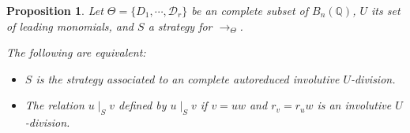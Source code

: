 \documentclass[10pt]{easychair}
\newtheorem{proposition}[theorem]{Proposition}
\theoremstyle{definition}
\newcommand\D{\mathcal{D}}
\newcommand\Q{\mathbb{Q}}
\newcommand\Weyl[1]{B_{#1}(\Q)}
\newcommand\rewTheta{\to_{\Theta}}
\newcommand\divInv[1]{\mid_{#1}}
\begin{document}
\begin{proposition}
Let $\Theta=\{D_1,\cdots,\D_r\}$ be an complete subset of
$\Weyl{n}$,  $U$ its set of leading monomials, and $S$ a strategy for $\rewTheta$.

The following are equivalent:
\begin{itemize}
\item $S$ is the strategy associated to an complete autoreduced involutive $U$-division.
\item The relation $u \divInv{S} v$ defined by $u \divInv{S} v$ if $v = u w$ and $r_v = r_u w$ is an involutive $U$-division. 
\end{itemize}
\end{proposition}
\end{document}
